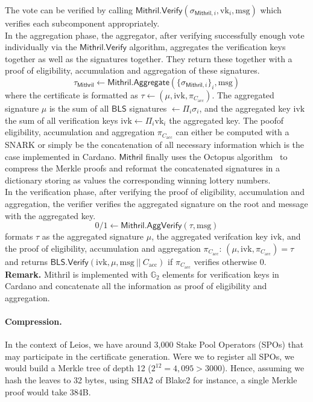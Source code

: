 \documentclass{article}
\newcommand{\G}[1]{\ensuremath{\mathbb{G}_{#1}}\xspace}
\newcommand{\vk}[1]{\ensuremath{\textrm{vk}_{#1}}\xspace}
\newcommand{\m}{\ensuremath{\textrm{msg}}\xspace}
\newcommand{\acc}{\ensuremath{\textrm{acc}}\xspace}
\newcommand{\ivk}{\ensuremath{\textrm{ivk}}\xspace}
\newcommand{\BLS}{\ensuremath{\mathsf{BLS}}\xspace}
\newcommand{\Mithril}{\ensuremath{\mathsf{Mithril}}\xspace}
\newcommand{\Verify}{\ensuremath{\mathsf{Verify}}\xspace}
\newcommand{\Aggregate}{\ensuremath{\mathsf{Aggregate}}\xspace}
\newcommand{\AggVerify}{\ensuremath{\mathsf{AggVerify}}\xspace}
\begin{document}
The vote can be verified by calling $\Mithril.\Verify(\sigma_{\Mithril, i}, \vk{i}, \m)$ which verifies each subcomponent appropriately.\\


In the aggregation phase, the aggregator, after verifying successfully enough vote individually via the \Mithril.\Verify algorithm, aggregates the verification keys together as well as the signatures together. They return these together with a proof of eligibility, accumulation and aggregation of these signatures.
$$
\tau_\Mithril \leftarrow \Mithril.\Aggregate(\{\sigma_{\Mithril,i}\}_i, \m)
$$
where the certificate is formatted as $\tau \leftarrow (\mu, \ivk, \pi_{C_\acc})$.
%
The aggregated signature $\mu$ is the sum of all \BLS signatures $\leftarrow \Pi_i \sigma_i$, and the aggregated key $\ivk$ the sum of all verification keys $\ivk \leftarrow \Pi_i \vk{i}$ the aggregated key. The poofof eligibility, accumulation and aggregation $\pi_{C_\acc}$ can either be computed with a SNARK or simply be the concatenation of all necessary information which is the case implemented in Cardano.
%
\Mithril finally uses the Octopus algorithm~\cite{aumasson2018improving} to compress the Merkle proofs and reformat the concatenated signatures in a dictionary storing as values the corresponding winning lottery numbers.\\


In the verification phase, after verifying the proof of eligibility, accumulation and aggregation, the verifier verifies the aggregated signature on the root and message with the aggregated key.
$$ 0/1 \leftarrow \Mithril.\AggVerify(\tau, \m)$$
formats $\tau$ as the aggregated signature $\mu$, the aggregated verifcation key \ivk, and the proof of eligibility, accumulation and aggregation $\pi_{C_\acc}$: $(\mu, \ivk, \pi_{C_\acc}) = \tau$ and returns $\BLS.\Verify(\ivk, \mu, \m\ ||\ C_\acc)$ if $\pi_{C_\acc}$ verifies otherwise 0.\\


\noindent\textbf{Remark.} Mithril is implemented with \G{2} elements for verification keys in Cardano and concatenate all the information as proof of eligibility and aggregation.

\paragraph{Compression.} In the context of Leios, we have around 3,000 Stake Pool Operators (SPOs) that may participate in the certificate generation.
Were we to register all SPOs, we would build a Merkle tree of depth 12 ($2^{12}=4,095 > 3000$). Hence, assuming we hash the leaves to 32 bytes, using SHA2 of Blake2 for instance, a single Merkle proof would take 384B.
\end{document}
